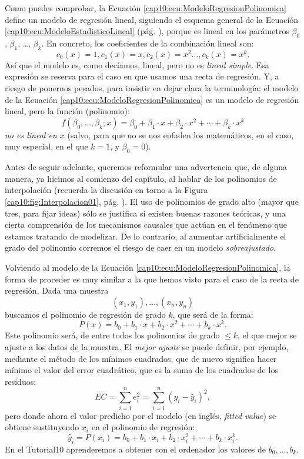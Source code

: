 Como puedes comprobar, la Ecuación \ref{cap10:ecu:ModeloRegresionPolinomica} define un modelo de regresión lineal, siguiendo el esquema general de la Ecuación \ref{cap10:ecu:ModeloEstadisticoLineal} (pág. \pageref{cap10:ecu:ModeloEstadisticoLineal}), porque es lineal en los parámetros $\beta_0$, $\beta_1$, \ldots, $\beta_k$. En concreto, los coeficientes de la combinación lineal son:
\[c_0(x)=1, c_1(x)=x, c_2(x)=x^2\ldots, c_k(x)=x^k.\]
Así que el modelo es, como decíamos, lineal, pero no es {\em lineal simple}. Esa expresión se reserva para el caso en que usamos una recta de regresión. Y, a riesgo de ponernos pesados, para insistir en dejar clara la terminología: el modelo de la Ecuación \ref{cap10:ecu:ModeloRegresionPolinomica} es un modelo de regresión lineal, pero la función (polinomio):
\[f(\beta_0,\ldots,\beta_k;x)=\beta_0 +\beta_1\cdot x+\beta_2\cdot x^2+\cdots+\beta_k\cdot x^k\]
{\em no es lineal en $x$} (salvo, para que no se nos enfaden los matemáticos, en el caso, muy
especial, en el que $k=1$, y $\beta_0=0$).

Antes de seguir adelante, queremos reformular una advertencia que, de alguna manera, ya hicimos al comienzo del capítulo, al hablar de los polinomios de interpolación (recuerda la discusión en torno a la Figura \ref{cap10:fig:Interpolacion01}, pág. \pageref{cap10:fig:Interpolacion01}). El uso de polinomios de grado alto (mayor que tres, para fijar ideas) sólo se justifica si existen buenas razones teóricas, y una cierta comprensión de los mecanismos causales que actúan en el fenómeno que estamos tratando de modelizar. De lo contrario, al aumentar artificialmente el grado del polinomio corremos el riesgo de caer en un modelo {\em sobreajustado}.

Volviendo al modelo de la Ecuación \ref{cap10:ecu:ModeloRegresionPolinomica}, la forma de proceder es muy similar a la que hemos visto para el caso de la recta de regresión. Dada una muestra
\[(x_1,y_1),\ldots,(x_n,y_n)\]
buscamos el {\sf polinomio de regresión de grado $k$}, que será de la forma:
\begin{equation}\label{cap10:ecu:PolinomioRegresion}
P(x)=b_0+b_1\cdot x+b_2\cdot x^2+\cdots+b_k\cdot x^k.
\end{equation}
Este polinomio será, de entre todos los polinomios de grado $\leq k$, el que mejor se ajuste a los datos de la muestra. El {\em mejor ajuste} se puede definir, por ejemplo, mediante el método de los mínimos cuadrados, que de nuevo significa hacer mínimo el valor del error cuadrático, que es la suma de los cuadrados de los residuos:
\[EC=\sum_{i=1}^n e_i^2=\sum_{i=1}^n(y_i-\hat y_i)^2,\]
pero donde ahora el valor predicho por el modelo (en inglés, {\em fitted value}) se obtiene sustituyendo $x_i$ en el polinomio de regresión:
\[\hat y_i= P(x_i)=b_0+b_1\cdot x_i+b_2\cdot x_i^2+\cdots+b_k\cdot x_i^k.\]
En el Tutorial10 aprenderemos a obtener con el ordenador los valores de $b_0,\ldots,b_k$.

